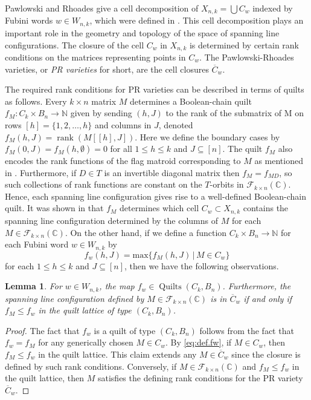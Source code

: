 \documentclass[12pt]{amsart}
\numberwithin{equation}{section}
\newtheorem{lemma}[theorem]{Lemma}
\theoremstyle{definition}
\newcommand{\quilt}{\operatorname{Quilts}}
\newcommand{\rank}{\operatorname{rank}}
\newcommand{\Fullrk}{\mathcal{F}_{k \times n}(\mathbb{C})}
\newcommand{\given}{\, | \,}
\begin{document}
Pawlowski and Rhoades give a cell decomposition of $X_{n,k}=\bigcup
C_{w}$ indexed by Fubini words $w \in W_{n,k}$, which were defined in
.  This cell decomposition plays an important
role in the geometry and topology of the space of spanning line
configurations.  The closure of the cell $C_{w}$ in $X_{n,k}$ is
determined by certain rank conditions on the matrices representing
points in $C_{w}$.  The Pawlowski-Rhoades varieties, or \emph{PR
varieties} for short, are the cell closures $\overline{C}_{w}$.

The required rank conditions for PR varieties can be described in
terms of quilts as follows.  Every $k \times n$ matrix $M$ determines
a Boolean-chain quilt $f_{M}: C_{k} \times B_{n} \longrightarrow
\mathbb{N}$ given by sending $(h,J)$ to the rank of the submatrix of M
on rows $[h]=\{1,2,\dotsc ,h \}$ and columns in $J$, denoted
$f_{M}(h,J)=\rank(M[[h],J])$.  Here we define the boundary cases by
$f_{M}(0,J)=f_{M}(h,\emptyset) =0$ for all $1\leq h\leq k$ and $J
\subseteq [n]$.  The quilt $f_{M}$ also encodes the rank functions of
the flag matroid corresponding to $M$ as mentioned in
.  Furthermore, if $D \in T$ is an invertible
diagonal matrix then $f_{M}=f_{MD}$, so such collections of rank
functions are constant on the $T$-orbits in $\Fullrk$. Hence, each
spanning line configuration gives rise to a well-defined Boolean-chain
quilt.  It was shown in \cite[Lemma 4.1.2]{Ryan.2022} that $f_{M}$
determines which cell $C_{w} \subset X_{n,k}$ contains the spanning
line configuration determined by the columns of $M$ for each $M \in
\Fullrk$.  On the other hand, if we define a function $C_{k}\times
B_{n} \longrightarrow \mathbb{N}$ for each Fubini word $w \in W_{n,k}$
by
\begin{equation}\label{eq:def.fw}
f_{w}(h,J) = \mathrm{max}\{f_{M}(h,J) \given M \in C_{w} \} 
\end{equation}
for each $1\leq h\leq k$ and $J \subseteq [n]$, then we have the
following observations.


\begin{lemma}\label{lem:medium.roats.quilt.lattice}
For $w \in W_{n,k}$, the map $f_{w} \in \quilt(C_{k},B_{n})$.
Furthermore, the spanning line configuration defined by $M \in \Fullrk$ is
in $\overline{C}_{w}$ if and only if $f_{M} \leq f_{w}$ in the quilt
lattice of type $(C_{k},B_{n})$.
\end{lemma}

\begin{proof}
The fact that $f_{w}$ is a quilt of type $(C_{k},B_{n})$ follows from
the fact that $f_{w}=f_{M}$ for any generically chosen $M \in C_{w}$.
By \eqref{eq:def.fw}, if $M \in C_{w}$, then $f_{M}\leq f_{w}$ in the
quilt lattice. This claim extends any $M \in \overline{C}_{w}$ since
the closure is defined by such rank conditions.  Conversely, if $M \in
\Fullrk$ and $f_{M} \leq f_{w}$ in the quilt lattice, then $M$
satisfies the defining rank conditions for the PR variety $\overline{C}_{w}$.
\end{proof}
\end{document}
